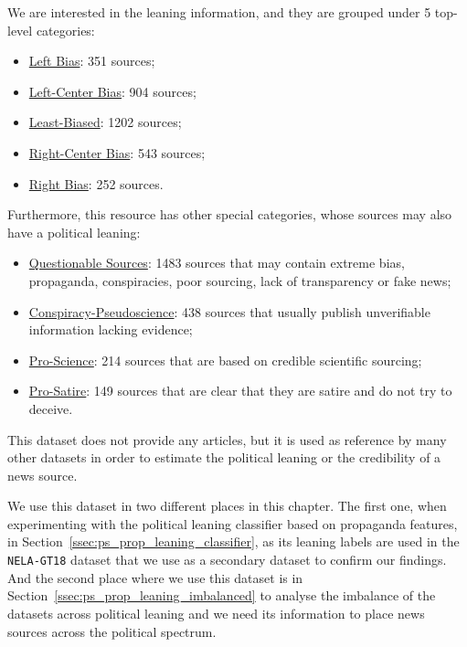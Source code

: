We are interested in the leaning information, and they are grouped under 5 top-level categories:

\begin{itemize}
    \item \href{https://mediabiasfactcheck.com/left/}{Left Bias}: 351 sources;
    \item \href{https://mediabiasfactcheck.com/leftcenter/}{Left-Center Bias}: 904 sources;
    \item \href{https://mediabiasfactcheck.com/center/}{Least-Biased}: 1202 sources;
    \item \href{https://mediabiasfactcheck.com/right-center/}{Right-Center Bias}: 543 sources;
    \item \href{https://mediabiasfactcheck.com/right/}{Right Bias}: 252 sources.
\end{itemize}

Furthermore, this resource has other special categories, whose sources may also have a political leaning:

\begin{itemize}
    \item \href{https://mediabiasfactcheck.com/fake-news/}{Questionable Sources}: 1483 sources that may contain extreme bias, propaganda, conspiracies, poor sourcing, lack of transparency or fake news;
    \item \href{https://mediabiasfactcheck.com/conspiracy/}{Conspiracy-Pseudoscience}: 438 sources that usually publish unverifiable information lacking evidence;
    \item \href{https://mediabiasfactcheck.com/pro-science/}{Pro-Science}: 214 sources that are based on credible scientific sourcing;
    \item \href{https://mediabiasfactcheck.com/satire/}{Pro-Satire}: 149 sources that are clear that they are satire and do not try to deceive.
\end{itemize}

This dataset does not provide any articles, but it is used as reference by many other datasets in order to estimate the political leaning or the credibility of a news source.

We use this dataset in two different places in this chapter.
The first one, when experimenting with the political leaning classifier based on propaganda features, in Section~\ref{ssec:ps_prop_leaning_classifier}, as its leaning labels are used in the \texttt{NELA-GT18} dataset that we use as a secondary dataset to confirm our findings.
And the second place where we use this dataset is in Section~\ref{ssec:ps_prop_leaning_imbalanced} to analyse the imbalance of the datasets across political leaning and we need its information to place news sources across the political spectrum.

